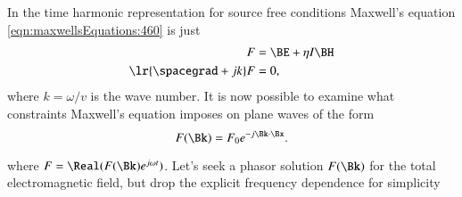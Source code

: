 %
%
In the time harmonic representation for source free conditions Maxwell's equation \cref{eqn:maxwellsEquations:460} is just
\begin{dmath}\label{eqn:planewaves:560}
\begin{aligned}
F &= \BE + \eta I \BH \\
\lr{ \spacegrad + j k } F &= 0,
\end{aligned}
\end{dmath}
where \( k = \omega/v \) is the wave number.
It is now possible to examine what constraints Maxwell's equation imposes on plane waves of the form
\begin{dmath}\label{eqn:planewaves:600}
F(\Bk) = F_0 e^{-j \Bk \cdot \Bx}.
\end{dmath}

where \( F = \Real( F(\Bk) e^{j \omega t} ) \).
Let's seek a phasor solution \( F(\Bk) \) for the total electromagnetic field, but drop the explicit frequency dependence for simplicity



